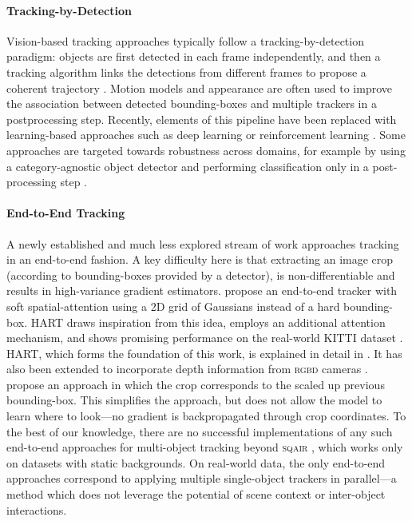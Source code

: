 	\paragraph{Tracking-by-Detection} Vision-based tracking approaches typically follow a tracking-by-detection paradigm: objects are first detected in each frame independently, and then a tracking algorithm links the detections from different frames to propose a coherent trajectory \cite{Zhang2008,Milan2014,Bae2017confidence,Keuper2018motion}.
	Motion models and appearance are often used to improve the association between detected bounding-boxes and multiple trackers in a postprocessing step.
	Recently, elements of this pipeline have been replaced with learning-based approaches such as deep learning \cite{Nam2016,Ning2017,Keuper2018motion,Bae2017confidence} or reinforcement learning \cite{Xiang2015}. Some approaches are targeted towards robustness across domains, for example by using a category-agnostic object detector and performing classification only in a post-processing step \cite{Osep2017,Posner2016}.
	
	
	\paragraph{End-to-End Tracking} A newly established and much less explored stream of work approaches tracking in an end-to-end fashion. A key difficulty here is that extracting an image crop (according to bounding-boxes provided by a detector), is non-differentiable and results in high-variance gradient estimators.
	\citet{Kahou2015ratm} propose an end-to-end tracker with soft spatial-attention using a 2D grid of Gaussians instead of a hard bounding-box. \Gls{HART} draws inspiration from this idea, employs an additional attention mechanism, and shows promising performance on the real-world KITTI dataset \cite{Kosiorek2017hierch}.
	\Gls{HART}, which forms the foundation of this work, is explained in detail in . It has also been extended to incorporate depth information from \textsc{rgbd} cameras \cite{Danesh2019deep}. \citet{Gordon2018re3} propose an approach in which the crop corresponds to the scaled up previous bounding-box. This simplifies the approach, but does not allow the model to learn where to look---\ie no gradient is backpropagated through crop coordinates.
	To the best of our knowledge, there are no successful implementations of any such end-to-end approaches for multi-object tracking beyond \textsc{sqair} \citep{Kosiorek2018sqair}, which works only on datasets with static backgrounds. On real-world data, the only end-to-end approaches correspond to applying multiple single-object trackers in parallel---a method which does not leverage the potential of scene context or inter-object interactions. 
	

